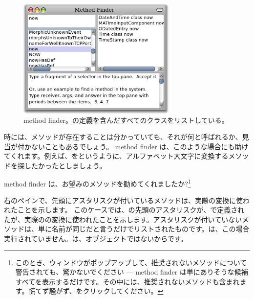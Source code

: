 \documentclass[a4paper,10pt,twoside]{book}
\begin{document}
\begin{figure}[hbt]
\centerline {\includegraphics[width=0.7\textwidth]{methodFinder-now}}
\caption{method finder。の定義を含んだすべてのクラスをリストしている。
}
\end{figure}

時には、メソッドが存在することは分かっていても、それが何と呼ばれるか、見当が付かないこともあるでしょう。
method finder は、このような場合にも助けてくれます。例えば、をというように、アルファベット大文字に変換するメソッドを探したかったとしましょう。

\noindent
method finder は、お望みのメソッドを勧めてくれましたか?\footnote{このとき、ウィンドウがポップアップして、推奨されないメソッドについて警告されても、驚かないでください --- method finder は単にありそうな候補すべてを表示するだけです。その中には、推奨されないメソッドも含まれます。慌てず騒がず、をクリックしてください。}

右のペインで、先頭にアスタリスクが付いているメソッドは、実際の変換に使われたことを示します。
このケースでは、の先頭のアスタリスクが、で定義されたが、実際のの変換に使われたことを示します。アスタリスクが付いていないメソッドは、単に名前が同じだと言うだけでリストされたものです。は、この場合実行されていません。は、オブジェクトではないからです。
\end{document}
